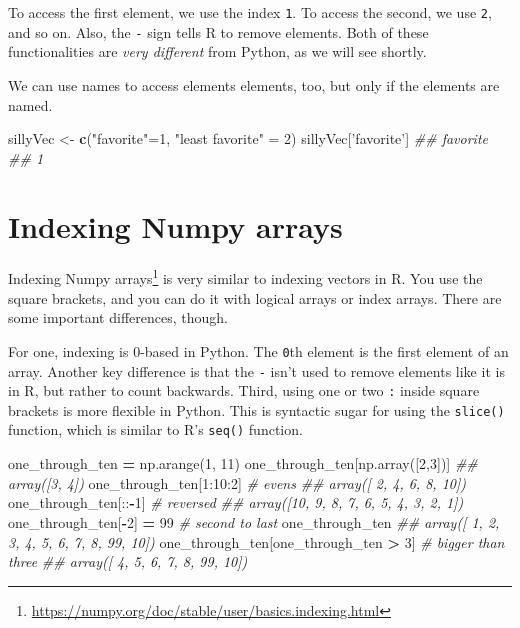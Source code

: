 \documentclass[12pt,krantz2]{krantz}
\makeatletter
\newenvironment{Shaded}{\begin{snugshade}}{\end{snugshade}}
\newcommand{\CommentTok}[1]{\textcolor[rgb]{0.37,0.37,0.37}{\textit{#1}}}
\newcommand{\DecValTok}[1]{\textcolor[rgb]{0.06,0.06,0.06}{#1}}
\newcommand{\KeywordTok}[1]{\textcolor[rgb]{0.27,0.27,0.27}{\textbf{#1}}}
\newcommand{\NormalTok}[1]{#1}
\newcommand{\OperatorTok}[1]{\textcolor[rgb]{0.43,0.43,0.43}{\textbf{#1}}}
\newcommand{\StringTok}[1]{\textcolor[rgb]{0.5,0.5,0.5}{#1}}
\renewcommand{\href}[2]{#2\footnote{\url{#1}}}
\newenvironment{kframe}{%
\medskip{}
\setlength{\fboxsep}{.8em}
 \def\at@end@of@kframe{}%
 \ifinner\ifhmode%
  \def\at@end@of@kframe{\end{minipage}}%
  \begin{minipage}{\columnwidth}%
 \fi\fi%
 \def\FrameCommand##1{\hskip\@totalleftmargin \hskip-\fboxsep
 \colorbox{shadecolor}{##1}\hskip-\fboxsep
     \hskip-\linewidth \hskip-\@totalleftmargin \hskip\columnwidth}%
 \MakeFramed {\advance\hsize-\width
   \@totalleftmargin\z@ \linewidth\hsize
   \@setminipage}}%
 {\par\unskip\endMakeFramed%
 \at@end@of@kframe}
\renewenvironment{Shaded}{\begin{kframe}}{\end{kframe}}
\makeatother
\begin{document}
To access the first element, we use the index \texttt{1}. To access the second, we use \texttt{2}, and so on. Also, the \texttt{-} sign tells R to remove elements. Both of these functionalities are \emph{very different} from Python, as we will see shortly.

We can use names to access elements elements, too, but only if the elements are named.

\begin{Shaded}
\begin{Highlighting}[]
\NormalTok{sillyVec <-}\StringTok{ }\KeywordTok{c}\NormalTok{(}\StringTok{"favorite"}\NormalTok{=}\DecValTok{1}\NormalTok{, }\StringTok{"least favorite"}\NormalTok{ =}\StringTok{ }\DecValTok{2}\NormalTok{)}
\NormalTok{sillyVec[}\StringTok{'favorite'}\NormalTok{]}
\CommentTok{## favorite }
\CommentTok{##        1}
\end{Highlighting}
\end{Shaded}

\hypertarget{indexing-numpy-arrays}{%
\section{Indexing Numpy arrays}\label{indexing-numpy-arrays}}

\href{https://numpy.org/doc/stable/user/basics.indexing.html}{Indexing Numpy arrays} is very similar to indexing vectors in R. You use the square brackets, and you can do it with logical arrays or index arrays. There are some important differences, though.

For one, indexing is 0-based in Python. The \texttt{0}th element is the first element of an array. Another key difference is that the \texttt{-} isn't used to remove elements like it is in R, but rather to count backwards. Third, using one or two \texttt{:} inside square brackets is more flexible in Python. This is syntactic sugar for using the \texttt{slice()} function, which is similar to R's \texttt{seq()} function.

\begin{Shaded}
\begin{Highlighting}[]
\NormalTok{one_through_ten }\OperatorTok{=}\NormalTok{ np.arange(}\DecValTok{1}\NormalTok{, }\DecValTok{11}\NormalTok{)}
\NormalTok{one_through_ten[np.array([}\DecValTok{2}\NormalTok{,}\DecValTok{3}\NormalTok{])]}
\CommentTok{## array([3, 4])}
\NormalTok{one_through_ten[}\DecValTok{1}\NormalTok{:}\DecValTok{10}\NormalTok{:}\DecValTok{2}\NormalTok{] }\CommentTok{# evens}
\CommentTok{## array([ 2,  4,  6,  8, 10])}
\NormalTok{one_through_ten[::}\OperatorTok{-}\DecValTok{1}\NormalTok{] }\CommentTok{# reversed}
\CommentTok{## array([10,  9,  8,  7,  6,  5,  4,  3,  2,  1])}
\NormalTok{one_through_ten[}\OperatorTok{-}\DecValTok{2}\NormalTok{] }\OperatorTok{=} \DecValTok{99} \CommentTok{# second to last}
\NormalTok{one_through_ten}
\CommentTok{## array([ 1,  2,  3,  4,  5,  6,  7,  8, 99, 10])}
\NormalTok{one_through_ten[one_through_ten }\OperatorTok{>} \DecValTok{3}\NormalTok{] }\CommentTok{# bigger than three}
\CommentTok{## array([ 4,  5,  6,  7,  8, 99, 10])}
\end{Highlighting}
\end{Shaded}
\end{document}
